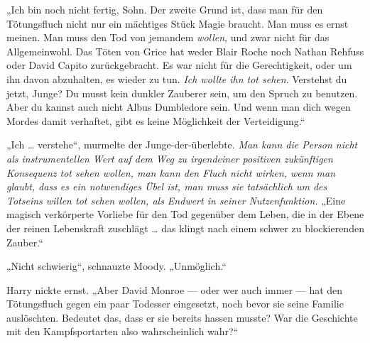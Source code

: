 „Ich bin noch nicht fertig, Sohn. Der zweite Grund ist, dass man für den Tötungsfluch nicht nur ein mächtiges Stück Magie braucht. Man muss es ernst meinen. Man muss den Tod von jemandem \emph{wollen}, und zwar nicht für das Allgemeinwohl. Das Töten von Grice hat weder Blair Roche noch Nathan Rehfuss oder David Capito zurückgebracht. Es war nicht für die Gerechtigkeit, oder um ihn davon abzuhalten, es wieder zu tun. \emph{Ich wollte ihn tot sehen}. Verstehst du jetzt, Junge? Du musst kein dunkler Zauberer sein, um den Spruch zu benutzen. Aber du kannst auch nicht Albus Dumbledore sein. Und wenn man dich wegen Mordes damit verhaftet, gibt es keine Möglichkeit der Verteidigung.“

„Ich … verstehe“, murmelte der Junge-der-überlebte.
\emph{Man kann die Person nicht als instrumentellen Wert auf dem Weg zu irgendeiner positiven zukünftigen Konsequenz tot sehen wollen, man kann den Fluch nicht wirken, wenn man glaubt, dass es ein notwendiges Übel ist, man muss sie tatsächlich um des Totseins willen tot sehen wollen, als Endwert in seiner Nutzenfunktion.}
„Eine magisch verkörperte Vorliebe für den Tod gegenüber dem Leben, die in der Ebene der reinen Lebenskraft zuschlägt … das klingt nach einem schwer zu blockierenden Zauber.“

„Nicht schwierig“, schnauzte Moody.
„Unmöglich.“

Harry nickte ernst.
„Aber David Monroe — oder wer auch immer — hat den Tötungsfluch gegen ein paar Todesser eingesetzt, noch bevor sie seine Familie auslöschten. Bedeutet das, dass er sie bereits hassen musste? War die Geschichte mit den Kampfsportarten also wahrscheinlich wahr?“

